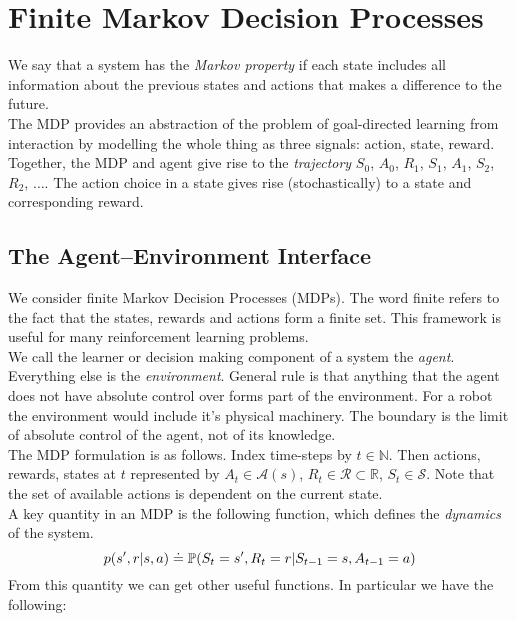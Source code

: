 \section{Finite Markov Decision Processes}
We say that a system has the \emph{Markov property} if each state includes all information about the previous states and actions that makes a difference to the future.\\

The MDP provides an abstraction of the problem of goal-directed learning from interaction by modelling the whole thing as three signals: action, state, reward.\\

Together, the MDP and agent give rise to the \emph{trajectory} $S_0$, $A_0$, $R_1$, $S_1$, $A_1$, $S_2$, $R_2$, $\dots$. The action choice in a state gives rise (stochastically) to a state and corresponding reward.

\subsection{The Agent–Environment Interface}
We consider finite Markov Decision Processes (MDPs). The word finite refers to the fact that the states, rewards and actions form a finite set. This framework is useful for many reinforcement learning problems.\\

We call the learner or decision making component of a system the \emph{agent}. Everything else is the \emph{environment}. General rule is that anything that the agent does not have absolute control over forms part of the environment. For a robot the environment would include it's physical machinery. The boundary is the limit of absolute control of the agent, not of its knowledge.\\

The MDP formulation is as follows. Index time-steps by $t \in \mathbb{N}$. Then actions, rewards, states at $t$ represented by $A_t \in \mathcal{A}(s)$, $R_t \in \mathcal{R} \subset \mathbb{R}$, $S_t \in \mathcal{S}$. Note that the set of available actions is dependent on the current state.\\

A key quantity in an MDP is the following function, which defines the \emph{dynamics} of the system.
\begin{equation}
    p(s', r | s, a) \doteq \P{} (S_t = s', R_t = r | S_{t-1} = s, A_{t-1} = a)
\end{equation}
From this quantity we can get other useful functions. In particular we have the following: 

